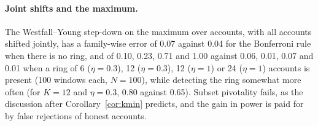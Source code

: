 \paragraph{Joint shifts and the maximum.} The Westfall--Young step-down on the maximum over accounts, with all accounts shifted jointly, has a family-wise error of 0.07 against 0.04 for the Bonferroni rule when there is no ring, and of 0.10, 0.23, 0.71 and 1.00 against 0.06, 0.01, 0.07 and 0.01 when a ring of 6 ($\eta=0.3$), 12 ($\eta=0.3$), 12 ($\eta=1$) or 24 ($\eta=1$) accounts is present (100 windows each, $N=100$), while detecting the ring somewhat more often (for $K=12$ and $\eta=0.3$, 0.80 against 0.65). Subset pivotality fails, as the discussion after Corollary~\ref{cor:kmin} predicts, and the gain in power is paid for by false rejections of honest accounts.
